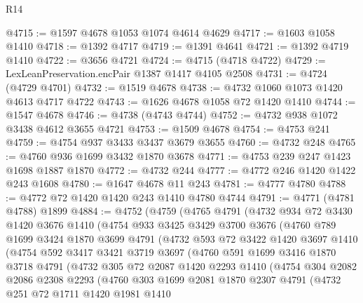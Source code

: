 \begin{lexlean}{R14}
\begin{coremodule}
@4715 := @1597 @4678 @1053 @1074 @4614 @4629
@4717 := @1603 @1058 @1410
@4718 := @1392 @4717
@4719 := @1391 @4641
@4721 := @1392 @4719 @1410
@4722 := @3656 @4721
@4724 := @4715 (@4718 @4722)
@4729 := LexLeanPreservation.encPair @1387 @1417 @4105 @2508
@4731 := @4724 (@4729 @4701)
@4732 := @1519 @4678
@4738 := @4732 @1060 @1073 @1420 @4613 @4717 @4722
@4743 := @1626 @4678 @1058 @72 @1420 @1410
@4744 := @1547 @4678
@4746 := @4738 (@4743 @4744)
@4752 := @4732 @938 @1072 @3438 @4612 @3655 @4721
@4753 := @1509 @4678
@4754 := @4753 @241
@4759 := @4754 @937 @3433 @3437 @3679 @3655
@4760 := @4732 @248
@4765 := @4760 @936 @1699 @3432 @1870 @3678
@4771 := @4753 @239 @247 @1423 @1698 @1887 @1870
@4772 := @4732 @244
@4777 := @4772 @246 @1420 @1422 @243 @1608
@4780 := @1647 @4678 @11 @243
@4781 := @4777 @4780
@4788 := @4772 @72 @1420 @1420 @243 @1410 @4780 @4744
@4791 := @4771 (@4781 @4788) @1899
@4884 := @4752
    (@4759
      (@4765
        @4791
        (@4732
          @934
          @72
          @3430
          @1420
          @3676
          @1410
          (@4754
            @933
            @3425
            @3429
            @3700
            @3676
            (@4760
              @789
              @1699
              @3424
              @1870
              @3699
              @4791
              (@4732
                @593
                @72
                @3422
                @1420
                @3697
                @1410
                (@4754
                  @592
                  @3417
                  @3421
                  @3719
                  @3697
                  (@4760
                    @591
                    @1699
                    @3416
                    @1870
                    @3718
                    @4791
                    (@4732
                      @305
                      @72
                      @2087
                      @1420
                      @2293
                      @1410
                      (@4754
                        @304
                        @2082
                        @2086
                        @2308
                        @2293
                        (@4760
                          @303
                          @1699
                          @2081
                          @1870
                          @2307
                          @4791
                          (@4732
                            @251
                            @72
                            @1711
                            @1420
                            @1981
                            @1410

\end{coremodule}
\end{lexlean}
